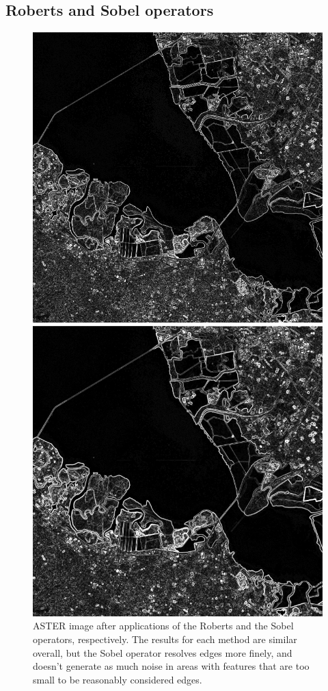 \documentclass[12pt]{article}
\begin{document}
\clearpage

\subsection{Roberts and Sobel operators}

\begin{figure}[h!]
    \centering
    \includegraphics[width=.6\linewidth]{figures/p9/aster_roberts.png}

    \vspace{.2em}
    \includegraphics[width=.6\linewidth]{figures/p9/aster_sobel.png}

    \caption{ASTER image after applications of the Roberts and the Sobel operators, respectively. The results for each method are similar overall, but the Sobel operator resolves edges more finely, and doesn't generate as much noise in areas with features that are too small to be reasonably considered edges.}
    \label{p9_rob_sob}
\end{figure}

\clearpage
\end{document}
